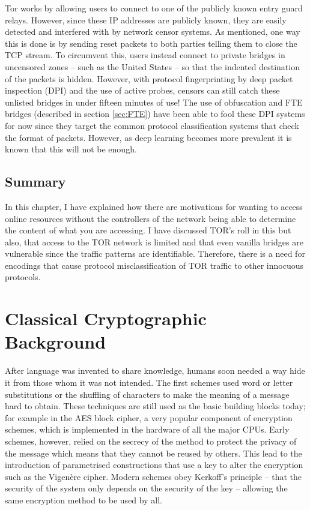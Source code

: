 \documentclass[ %
                    author={Samuel Russell},
                supervisor={Prof. Bogdan Warinschi},
                    degree={MEng},
                     title={Innocuous Ciphertexts},
                  subtitle={The DE-CENSOR Scheme},
                      type={Research},
                      year={2018} ]{dissertation}
\begin{document}
Tor works by allowing users to connect to one of the publicly known entry guard relays. However, since these IP addresses are publicly known, they are easily detected and interfered with by network censor systems. As mentioned, one way this is done is by sending reset packets to both parties telling them to close the TCP stream.
To circumvent this, users instead connect to private bridges in uncensored zones -- such as the United States -- so that the indented destination of the packets is hidden. However, with protocol fingerprinting by deep packet inspection (DPI) and the use of active probes, censors can still catch these unlisted bridges in under fifteen minutes of use!
The use of obfuscation and FTE bridges (described in section \ref{sec:FTE}) have been able to fool these DPI systems for now since they target the common protocol classification systems that check the format of packets. However, as deep learning becomes more prevalent it is known that this will not be enough.

\section{Summary}

In this chapter, I have explained how there are motivations for wanting to access online resources without the controllers of the network being able to determine the content of what you are accessing. I have discussed TOR's roll in this but also, that access to the TOR network is limited and that even vanilla bridges are vulnerable since the traffic patterns are identifiable. Therefore, there is a need for encodings that cause protocol misclassification of TOR traffic to other innocuous protocols.


\chapter{Classical Cryptographic Background}
\label{chap:technical}

After language was invented to share knowledge, humans soon needed a way hide it from those whom it was not intended. The first schemes used word or letter substitutions or the shuffling of characters to make the meaning of a message hard to obtain.
These techniques are still used as the basic building blocks today; for example in the AES block cipher, a very popular component of encryption schemes, which is implemented in the hardware of all the major CPUs.
Early schemes, however, relied on the secrecy of the method to protect the privacy of the message which means that they cannot be reused by others.
This lead to the introduction of parametrised constructions that use a key to alter the encryption such as the Vigen\`ere cipher.
Modern schemes obey Kerkoff's principle -- that the security of the system only depends on the security of the key -- allowing the same encryption method to be used by all.
\end{document}
